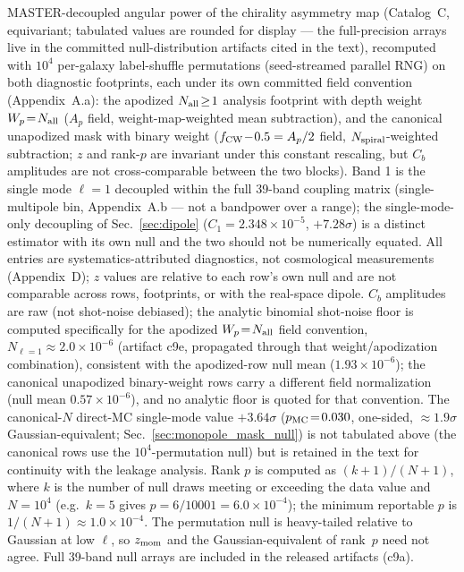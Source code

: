 \documentclass[aps,prd,twocolumn,superscriptaddress,preprintnumbers,nofootinbib,longbibliography,floatfix]{revtex4-2}
\newcommand{\sigmaunit}{\sigma}
\begin{document}
\begin{table}[tbp]
\caption{MASTER-decoupled angular power of the chirality asymmetry map (Catalog~C, equivariant; tabulated values are rounded for display --- the full-precision arrays live in the committed null-distribution artifacts cited in the text), recomputed with $10^4$ per-galaxy label-shuffle permutations (seed-streamed parallel RNG) on both diagnostic footprints, each under its own committed field convention (Appendix~A.a): the apodized $N_{\rm all}\!\geq\!1$ analysis footprint with depth weight $W_p\!=\!N_{\rm all}$ ($A_p$ field, weight-map-weighted mean subtraction), and the canonical unapodized mask with binary weight ($f_{\rm CW}\!-\!0.5 = A_p/2$ field, $N_{\rm spiral}$-weighted subtraction; $z$ and rank-$p$ are invariant under this constant rescaling, but $C_b$ amplitudes are not cross-comparable between the two blocks). Band 1 is the single mode $\ell\!=\!1$ decoupled within the full 39-band coupling matrix (single-multipole bin, Appendix~A.b --- not a bandpower over a range); the single-mode-only decoupling of Sec.~\ref{sec:dipole} ($C_1\!=\!2.348\!\times\!10^{-5}$, $+7.28\sigmaunit$) is a distinct estimator with its own null and the two should not be numerically equated. All entries are systematics-attributed diagnostics, not cosmological measurements (Appendix~D); $z$ values are relative to each row's own null and are not comparable across rows, footprints, or with the real-space dipole. $C_b$ amplitudes are raw (not shot-noise debiased); the analytic binomial shot-noise floor is computed specifically for the apodized $W_p\!=\!N_{\rm all}$ field convention, $N_{\ell=1}\!\approx\!2.0\!\times\!10^{-6}$ (artifact c9e, propagated through that weight/apodization combination), consistent with the apodized-row null mean ($1.93\!\times\!10^{-6}$); the canonical unapodized binary-weight rows carry a different field normalization (null mean $0.57\!\times\!10^{-6}$), and no analytic floor is quoted for that convention. The canonical-$N$ direct-MC single-mode value $+3.64\sigmaunit$ ($p_{\rm MC}\!=\!0.030$, one-sided, ${\approx}1.9\sigmaunit$ Gaussian-equivalent; Sec.~\ref{sec:monopole_mask_null}) is not tabulated above (the canonical rows use the $10^4$-permutation null) but is retained in the text for continuity with the leakage analysis. Rank $p$ is computed as $(k+1)/(N+1)$, where $k$ is the number of null draws meeting or exceeding the data value and $N\!=\!10^4$ (e.g.\ $k\!=\!5$ gives $p\!=\!6/10001\!=\!6.0\!\times\!10^{-4}$); the minimum reportable $p$ is $1/(N{+}1)\!\approx\!1.0\!\times\!10^{-4}$. The permutation null is heavy-tailed relative to Gaussian at low $\ell$, so $z_{\rm mom}$ and the Gaussian-equivalent of rank~$p$ need not agree. Full 39-band null arrays are included in the released artifacts (c9a).\label{tab:multipole}}

\end{table}
\end{document}

